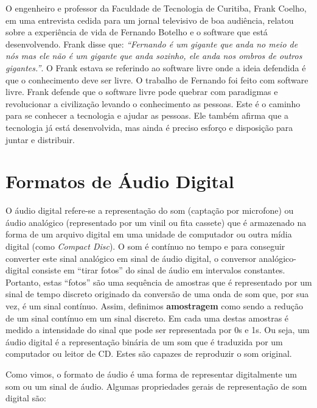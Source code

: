 O engenheiro e professor da Faculdade de Tecnologia de Curitiba, Frank Coelho, em uma entrevista cedida para um jornal televisivo de boa audiência, relatou sobre a experiência de vida de Fernando Botelho e o software que está desenvolvendo. Frank disse que: \textit{``Fernando é um gigante que anda no meio de nós mas ele não é um gigante que anda sozinho, ele anda nos ombros de outros gigantes.''}. O Frank estava se referindo ao software livre onde a ideia defendida é que o conhecimento deve ser livre. O trabalho de Fernando foi feito com software livre. Frank defende que o software livre pode quebrar com paradigmas e revolucionar a civilização levando o conhecimento as pessoas. Este é o caminho para se conhecer a tecnologia e ajudar as pessoas. Ele também afirma que a tecnologia já está desenvolvida, mas ainda é preciso esforço e disposição para juntar e distribuir.



\section{Formatos de Áudio Digital}

O áudio digital refere-se a representação do som (captação por microfone) ou áudio analógico (representado por um vinil ou fita cassete) que é armazenado na forma de um arquivo digital em uma unidade de computador ou outra mídia digital (como \textit{Compact Disc}). O som é contínuo no tempo e para conseguir converter este sinal analógico em sinal de áudio digital, o conversor analógico-digital consiste em ``tirar fotos'' do sinal de áudio em intervalos constantes. Portanto, estas ``fotos'' são uma sequência de amostras que é representado por um sinal de tempo discreto originado da conversão de uma onda de som que, por sua vez, é um sinal contínuo. Assim, definimos \textbf{amostragem} como sendo a redução de um sinal contínuo em um sinal discreto. Em cada uma destas amostras é medido a intensidade do sinal que pode ser representada por 0s e 1s. Ou seja, um áudio digital é a representação binária de um som que é traduzida por um computador ou leitor de CD. Estes são capazes de reproduzir o som original.

Como vimos, o formato de áudio é uma forma de representar digitalmente um som ou um sinal de áudio. Algumas propriedades gerais de representação de som digital são:

